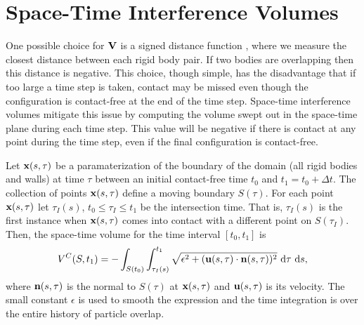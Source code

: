 \section{Space-Time Interference Volumes}\label{sec:stiv}

One possible choice for ${\mathbf{V}}$ is a signed distance function \cite{Yan2017}, where we measure the closest distance between each rigid body pair. If two bodies  are overlapping then this distance is negative. This choice, though simple, has the disadvantage that if too large a time step is taken, contact may be missed even though the configuration is contact-free at the end of the time step.  Space-time interference volumes \cite{Harmon2011, Lu2017}  mitigate this issue by computing the volume swept out in the space-time plane during each time step. This value will be negative if there is contact at any point during the time step, even if the final configuration is contact-free. 

Let ${\mathbf{x}}(s,\tau)$ be a paramaterization of the boundary of the domain (all rigid bodies and walls) at time $\tau$ between an initial contact-free time $t_0$ and $t_1 = t_0+\Delta t$. The collection of points ${\mathbf{x}}(s,\tau)$ define a moving boundary $S(\tau)$. For each point ${\mathbf{x}}(s,\tau)$ let $\tau_I(s)$, $t_0 \leq \tau_I\leq t_1$ be the intersection time. That is, $\tau_I(s)$ is the first instance when ${\mathbf{x}}(s,\tau)$ comes into contact with a different point on $S(\tau_I)$. Then, the space-time volume for the time interval $[t_0, t_1]$ is
\begin{equation}\label{eq:stiv1}
V^C(S,t_1) = -\int_{S(t_0)}\int_{\tau_I(s)}^{t_1} \sqrt{\epsilon^2 + ({\mathbf{u}}(s,\tau)\cdot{\mathbf{n}}(s,\tau))^2}~\text{d}\tau~\text{d}s,\end{equation}
where ${\mathbf{n}}(s,\tau)$ is the normal to $S(\tau)$ at ${\mathbf{x}}(s,\tau)$ and ${\mathbf{u}}(s,\tau)$ is its velocity. The small constant $\epsilon$ is used to smooth the expression and the time integration is over the entire history of particle overlap. 

